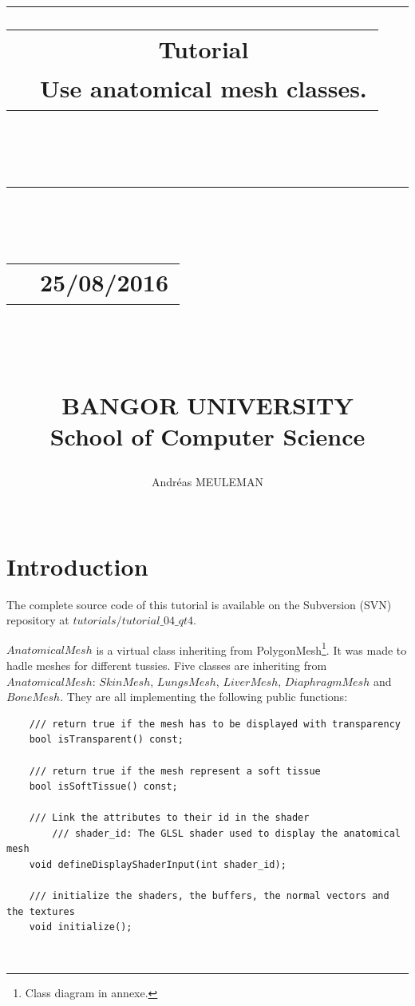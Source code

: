 \documentclass[12pt]{report}
\begin{document}
\newlength{\larg}
\setlength{\larg}{14.5cm}
\lstset{inputencoding=utf8/latin1}
\title{
{\rule{\larg}{1mm}}\vspace{7mm}
\begin{tabular}{p{0cm} c}
   & { {\textbf{Tutorial}}} \\
   & {\huge Use anatomical mesh classes.} \\
\end{tabular}\\
\vspace{2mm}
{\rule{\larg}{1mm}}
\vspace{2mm} \\
\begin{tabular}{p{11cm} r}
   & {\large  25/08/2016}
\end{tabular}\\
\vspace{2cm}
\large{\textit{} \\
BANGOR UNIVERSITY\\
School of Computer Science}
\vspace{5cm}
}
\author{\begin{tabular}{p{13.7cm} r}
Andréas MEULEMAN
\end{tabular}\\
\hline }
\date{}
\maketitle

\chapter{Introduction}

	The complete source code of this tutorial is available on the Subversion (SVN) repository at $tutorials/tutorial\_04\_qt4$. 
	
	$AnatomicalMesh$ is a virtual class inheriting from PolygonMesh\footnote{Class diagram in annexe.}. It was made to hadle meshes for different tussies. Five classes are inheriting from $AnatomicalMesh$: $SkinMesh$, $LungsMesh$, $LiverMesh$, $DiaphragmMesh$ and $BoneMesh$. They are all implementing the following public functions: \\ 

\begin{lstlisting}
	/// return true if the mesh has to be displayed with transparency
	bool isTransparent() const;

	/// return true if the mesh represent a soft tissue
	bool isSoftTissue() const;

	/// Link the attributes to their id in the shader
    	/// shader_id: The GLSL shader used to display the anatomical mesh
	void defineDisplayShaderInput(int shader_id);

	/// initialize the shaders, the buffers, the normal vectors and the textures
	void initialize();
\end{lstlisting}
~\\
\end{document}
